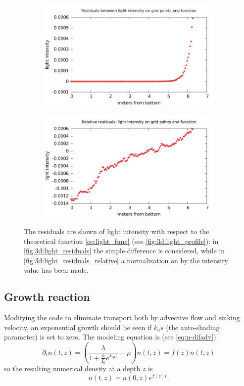 \begin{figure} 
  \centering
  \begin{subfigure}[b]{\textwidth}
    \includegraphics[width=\textwidth]{data/3D_model/light_residuals}
    \caption{}
    \label{fig:3d:light_residuals}
  \end{subfigure}
  
  \begin{subfigure}[b]{\textwidth}
    \includegraphics[width=\textwidth]{data/3D_model/light_residuals_relative}
    \caption{}
    \label{fig:3d:light_residuals_relative}
  \end{subfigure}
  \caption{The residuals are shown of light intensity with respect to the theoretical function \autoref{eq:light_func} (see \autoref{fig:3d:light_profile}): in \autoref{fig:3d:light_residuals} the simple difference is considered, while in \autoref{fig:3d:light_residuals_relative} a normalization on by the intensity value has been made.}
    \label{fig:3d_light_B}
\end{figure}


\subsection{Growth reaction}
Modifying the code to eliminate transport both by advective flow and sinking velocity, an exponential growth should be seen if $k_as$ (the auto-shading parameter) is set to zero. The modeling equation is (see \autoref{eq:n-difadv})
\[ \partial_t n(t,z) = \left(\frac{\lambda}{1+\frac{h}{I_0}e^{k_{bg}z}} -\mu\right)n(t,z) = f(z)n(t,z)\]
so the resulting numerical density at a depth $z$ is
\[ n(t,z) = n(0,z)e^{f(z)t} . \]


